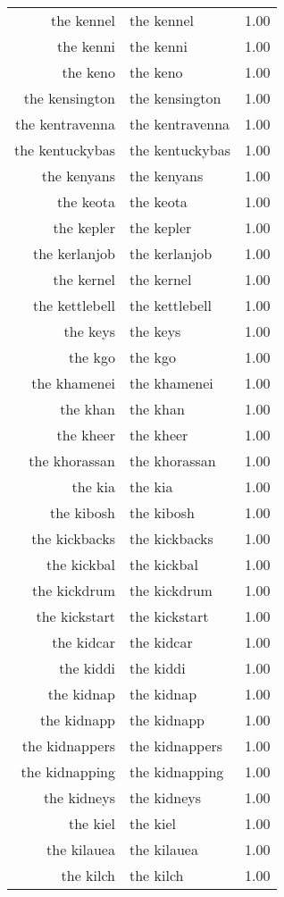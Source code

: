 \begin{table}[ht]
\begin{tabular}{rlr}
  the kennel & the kennel & 1.00 \\ 
  the kenni & the kenni & 1.00 \\ 
  the keno & the keno & 1.00 \\ 
  the kensington & the kensington & 1.00 \\ 
  the kentravenna & the kentravenna & 1.00 \\ 
  the kentuckybas & the kentuckybas & 1.00 \\ 
  the kenyans & the kenyans & 1.00 \\ 
  the keota & the keota & 1.00 \\ 
  the kepler & the kepler & 1.00 \\ 
  the kerlanjob & the kerlanjob & 1.00 \\ 
  the kernel & the kernel & 1.00 \\ 
  the kettlebell & the kettlebell & 1.00 \\ 
  the keys & the keys & 1.00 \\ 
  the kgo & the kgo & 1.00 \\ 
  the khamenei & the khamenei & 1.00 \\ 
  the khan & the khan & 1.00 \\ 
  the kheer & the kheer & 1.00 \\ 
  the khorassan & the khorassan & 1.00 \\ 
  the kia & the kia & 1.00 \\ 
  the kibosh & the kibosh & 1.00 \\ 
  the kickbacks & the kickbacks & 1.00 \\ 
  the kickbal & the kickbal & 1.00 \\ 
  the kickdrum & the kickdrum & 1.00 \\ 
  the kickstart & the kickstart & 1.00 \\ 
  the kidcar & the kidcar & 1.00 \\ 
  the kiddi & the kiddi & 1.00 \\ 
  the kidnap & the kidnap & 1.00 \\ 
  the kidnapp & the kidnapp & 1.00 \\ 
  the kidnappers & the kidnappers & 1.00 \\ 
  the kidnapping & the kidnapping & 1.00 \\ 
  the kidneys & the kidneys & 1.00 \\ 
  the kiel & the kiel & 1.00 \\ 
  the kilauea & the kilauea & 1.00 \\ 
  the kilch & the kilch & 1.00 \\ 

\end{tabular}
\end{table}
